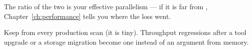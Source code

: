 The ratio of the two is your effective parallelism --- if it is far from
, Chapter~\ref{ch:performance} tells you where the loss went.

\begin{jtip}
Keep  from every production scan (it is tiny). Throughput
regressions after a tool upgrade or a storage migration become one  instead
of an argument from memory.
\end{jtip}
